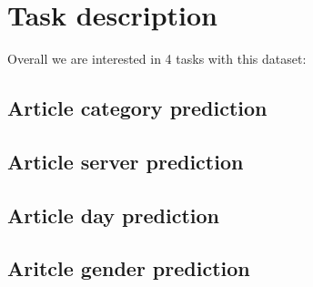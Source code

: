 \section{Task description}
Overall we are interested in 4 tasks with this dataset:

\subsection{Article category prediction}

\subsection{Article server prediction}

\subsection{Article day prediction}

\subsection{Aritcle gender prediction}

